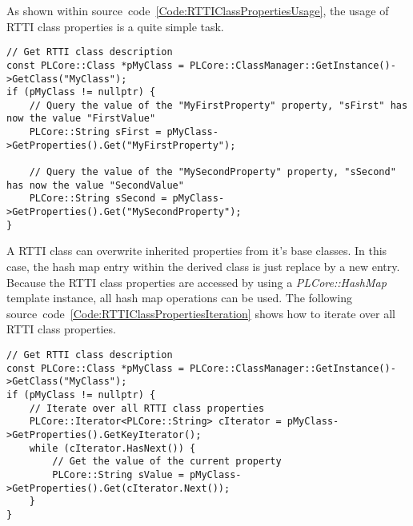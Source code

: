 As shown within source~code~\ref{Code:RTTIClassPropertiesUsage}, the usage of RTTI class properties is a quite simple task.
\begin{lstlisting}[float=htb,label=Code:RTTIClassPropertiesUsage,caption={Accessing RTTI class properties}]
// Get RTTI class description
const PLCore::Class *pMyClass = PLCore::ClassManager::GetInstance()->GetClass("MyClass");
if (pMyClass != nullptr) {
	// Query the value of the "MyFirstProperty" property, "sFirst" has now the value "FirstValue"
	PLCore::String sFirst = pMyClass->GetProperties().Get("MyFirstProperty");

	// Query the value of the "MySecondProperty" property, "sSecond" has now the value "SecondValue"
	PLCore::String sSecond = pMyClass->GetProperties().Get("MySecondProperty");
}
\end{lstlisting}
A RTTI class can overwrite inherited properties from it's base classes. In this case, the hash map entry within the derived class is just replace by a new entry. Because the RTTI class properties are accessed by using a \emph{PLCore::HashMap} template instance, all hash map operations can be used. The following source~code~\ref{Code:RTTIClassPropertiesIteration} shows how to iterate over all RTTI class properties.
\begin{lstlisting}[float=htb,label=Code:RTTIClassPropertiesIteration,caption={Iterating over all RTTI class properties}]
// Get RTTI class description
const PLCore::Class *pMyClass = PLCore::ClassManager::GetInstance()->GetClass("MyClass");
if (pMyClass != nullptr) {
	// Iterate over all RTTI class properties
	PLCore::Iterator<PLCore::String> cIterator = pMyClass->GetProperties().GetKeyIterator();
	while (cIterator.HasNext()) {
		// Get the value of the current property
		PLCore::String sValue = pMyClass->GetProperties().Get(cIterator.Next());
	}
}
\end{lstlisting}
